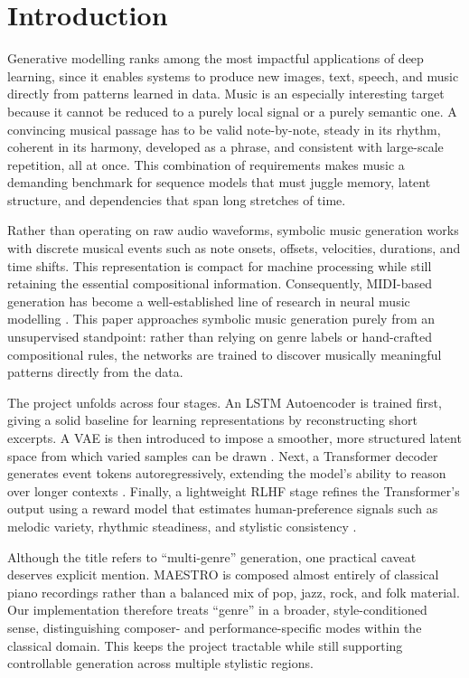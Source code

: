 \documentclass[conference]{IEEEtran}
\begin{document}
\section{Introduction}
Generative modelling ranks among the most impactful applications of deep learning, since it enables systems to produce new images, text, speech, and music directly from patterns learned in data. Music is an especially interesting target because it cannot be reduced to a purely local signal or a purely semantic one. A convincing musical passage has to be valid note-by-note, steady in its rhythm, coherent in its harmony, developed as a phrase, and consistent with large-scale repetition, all at once. This combination of requirements makes music a demanding benchmark for sequence models that must juggle memory, latent structure, and dependencies that span long stretches of time.

Rather than operating on raw audio waveforms, symbolic music generation works with discrete musical events such as note onsets, offsets, velocities, durations, and time shifts. This representation is compact for machine processing while still retaining the essential compositional information. Consequently, MIDI-based generation has become a well-established line of research in neural music modelling \cite{maestro, timewithfeeling}. This paper approaches symbolic music generation purely from an unsupervised standpoint: rather than relying on genre labels or hand-crafted compositional rules, the networks are trained to discover musically meaningful patterns directly from the data.

The project unfolds across four stages. An LSTM Autoencoder is trained first, giving a solid baseline for learning representations by reconstructing short excerpts. A VAE is then introduced to impose a smoother, more structured latent space from which varied samples can be drawn \cite{vae}. Next, a Transformer decoder generates event tokens autoregressively, extending the model's ability to reason over longer contexts \cite{attention, musictransformer}. Finally, a lightweight RLHF stage refines the Transformer's output using a reward model that estimates human-preference signals such as melodic variety, rhythmic steadiness, and stylistic consistency \cite{rlhf, instructgpt}.

Although the title refers to ``multi-genre'' generation, one practical caveat deserves explicit mention. MAESTRO is composed almost entirely of classical piano recordings rather than a balanced mix of pop, jazz, rock, and folk material. Our implementation therefore treats ``genre'' in a broader, style-conditioned sense, distinguishing composer- and performance-specific modes within the classical domain. This keeps the project tractable while still supporting controllable generation across multiple stylistic regions.
\end{document}
